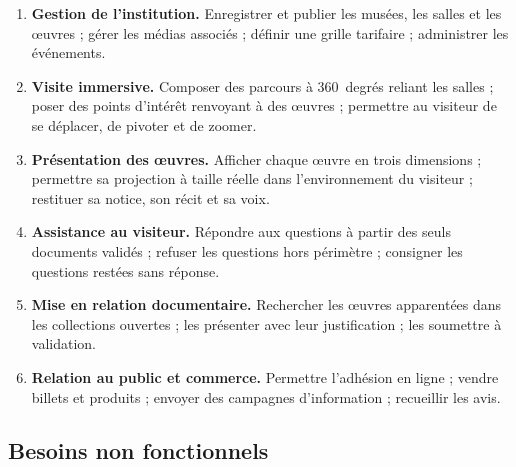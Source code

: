 \begin{enumerate}
  \item \textbf{Gestion de l'institution.} Enregistrer et publier les musées,
        les salles et les œuvres ; gérer les médias associés ; définir une
        grille tarifaire ; administrer les événements.

  \item \textbf{Visite immersive.} Composer des parcours à 360~degrés reliant
        les salles ; poser des points d'intérêt renvoyant à des œuvres ;
        permettre au visiteur de se déplacer, de pivoter et de zoomer.

  \item \textbf{Présentation des œuvres.} Afficher chaque œuvre en trois
        dimensions ; permettre sa projection à taille réelle dans
        l'environnement du visiteur ; restituer sa notice, son récit et sa voix.

  \item \textbf{Assistance au visiteur.} Répondre aux questions à partir des
        seuls documents validés ; refuser les questions hors périmètre ;
        consigner les questions restées sans réponse.

  \item \textbf{Mise en relation documentaire.} Rechercher les œuvres
        apparentées dans les collections ouvertes ; les présenter avec leur
        justification ; les soumettre à validation.

  \item \textbf{Relation au public et commerce.} Permettre l'adhésion en ligne ;
        vendre billets et produits ; envoyer des campagnes d'information ;
        recueillir les avis.
\end{enumerate}

\subsection{Besoins non fonctionnels}


